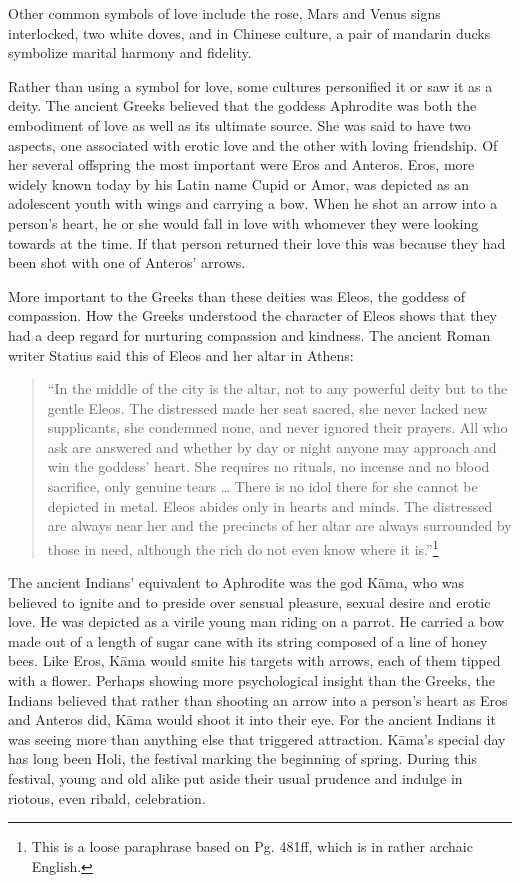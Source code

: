 \documentclass[10pt, openright]{book}
\begin{document}
Other common symbols of love include the rose, Mars and Venus signs interlocked, two white doves, and in Chinese culture, a pair of mandarin ducks symbolize marital harmony and fidelity.


Rather than using a symbol for love, some cultures personified it or saw it as a deity. The ancient Greeks believed that the goddess Aphrodite was both the embodiment of love as well as its ultimate source. She was said to have two aspects, one associated with erotic love and the other with loving friendship. Of her several offspring the most important were Eros and Anteros. Eros, more widely known today by his Latin name Cupid or Amor, was depicted as an adolescent youth with wings and carrying a bow. When he shot an arrow into a person’s heart, he or she would fall in love with whomever they were looking towards at the time. If that person returned their love this was because they had been shot with one of Anteros’ arrows.


More important to the Greeks than these deities was Eleos, the goddess of compassion. How the Greeks understood the character of Eleos shows that they had a deep regard for nurturing compassion and kindness. The ancient Roman writer Statius said this of Eleos and her altar in Athens:


\begin{quote}

\hspace{-0.4em}“In the middle of the city is the altar, not to any powerful deity but to the gentle Eleos. The distressed made her seat sacred, she never lacked new supplicants, she condemned none, and never ignored their prayers. All who ask are answered and whether by day or night anyone may approach and win the goddess’ heart. She requires no rituals, no incense and no blood sacrifice, only genuine tears … There is no idol there for she cannot be depicted in metal. Eleos abides only in hearts and minds. The distressed are always near her and the precincts of her altar are always surrounded by those in need, although the rich do not even know where it is.”\footnote {This is a loose paraphrase based on \cite{Mozley 1928} Pg. 481ff, which is in rather archaic English.}


\end{quote}
The ancient Indians’ equivalent to Aphrodite was the god Kāma, who was believed to ignite and to preside over sensual pleasure, sexual desire and erotic love. He was depicted as a virile young man riding on a parrot. He carried a bow made out of a length of sugar cane with its string composed of a line of honey bees. Like Eros, Kāma would smite his targets with arrows, each of them tipped with a flower. Perhaps showing more psychological insight than the Greeks, the Indians believed that rather than shooting an arrow into a person’s heart as Eros and Anteros did, Kāma would shoot it into their eye. For the ancient Indians it was seeing more than anything else that triggered attraction. Kāma’s special day has long been Holi, the festival marking the beginning of spring. During this festival, young and old alike put aside their usual prudence and indulge in riotous, even ribald, celebration.
\end{document}
